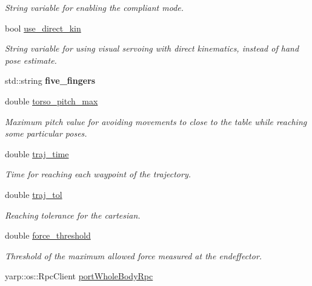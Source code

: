 \begin{DoxyCompactItemize}
\begin{DoxyCompactList}\small\item\em String variable for enabling the compliant mode. \end{DoxyCompactList}\item 
bool \hyperlink{classGraspExecution_a87216175d159e749932552f999ec7267}{use\+\_\+direct\+\_\+kin}\label{classGraspExecution_a87216175d159e749932552f999ec7267}

\begin{DoxyCompactList}\small\item\em String variable for using visual servoing with direct kinematics, instead of hand pose estimate. \end{DoxyCompactList}\item 
std\+::string {\bfseries five\+\_\+fingers}\label{classGraspExecution_a01cec6b4c21531dbc733488924d80ca8}

\item 
double \hyperlink{classGraspExecution_a90b6870ad31a75181598b069f16d128a}{torso\+\_\+pitch\+\_\+max}\label{classGraspExecution_a90b6870ad31a75181598b069f16d128a}

\begin{DoxyCompactList}\small\item\em Maximum pitch value for avoiding movements to close to the table while reaching some particular poses. \end{DoxyCompactList}\item 
double \hyperlink{classGraspExecution_a0cff011c551bd26e5aef02acca1dff2f}{traj\+\_\+time}\label{classGraspExecution_a0cff011c551bd26e5aef02acca1dff2f}

\begin{DoxyCompactList}\small\item\em Time for reaching each waypoint of the trajectory. \end{DoxyCompactList}\item 
double \hyperlink{classGraspExecution_af5b8332d5b7a9ba571ceab005cd8b849}{traj\+\_\+tol}\label{classGraspExecution_af5b8332d5b7a9ba571ceab005cd8b849}

\begin{DoxyCompactList}\small\item\em Reaching tolerance for the cartesian. \end{DoxyCompactList}\item 
double \hyperlink{classGraspExecution_a26278749ada92b79a85100ffc3b7588f}{force\+\_\+threshold}
\begin{DoxyCompactList}\small\item\em Threshold of the maximum allowed force measured at the endeffector. \end{DoxyCompactList}\item 
yarp\+::os\+::\+Rpc\+Client \hyperlink{classGraspExecution_a12be989706174d8a9b0370014b8251b9}{port\+Whole\+Body\+Rpc}\label{classGraspExecution_a12be989706174d8a9b0370014b8251b9}


\end{DoxyCompactItemize}
